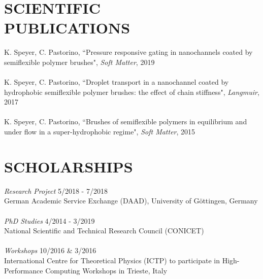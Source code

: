 \documentclass[margin]{res}
\begin{document}
\begin{resume}
\section{SCIENTIFIC \\ PUBLICATIONS}            
		       K. Speyer, C. Pastorino, ``Pressure responsive gating in 
		nanochannels coated by semiflexible polymer brushes", 
		       {\sl Soft Matter}, 2019 \\ \\ 
		       K. Speyer, C. Pastorino, ``Droplet transport in a 
		nanochannel coated by hydrophobic semiflexible polymer 
		       brushes: the effect of chain stiffness", {\sl Langmuir},
		       2017 \\ \\
		K. Speyer, C. Pastorino, ``Brushes of semiflexible polymers in 
		equilibrium and under flow in a super-hydrophobic regime", 
		       {\sl Soft Matter}, 2015 

\section{SCHOLARSHIPS}  {\sl Research Project} \hfill  5/2018 - 7/2018 \\
	German Academic Service Exchange
	(DAAD), University of G\"ottingen, Germany \\ \\ 
	{\sl PhD Studies} \hfill  4/2014 - 3/2019 \\
	National Scientific and Technical Research Council (CONICET) \\ \\
	{\sl Workshops} \hfill { 10/2016 \& 3/2016} \\
	International Centre for Theoretical Physics (ICTP) 
	to participate in High-Performance Computing Workshops in Trieste, Italy



\end{resume}
\end{document}
